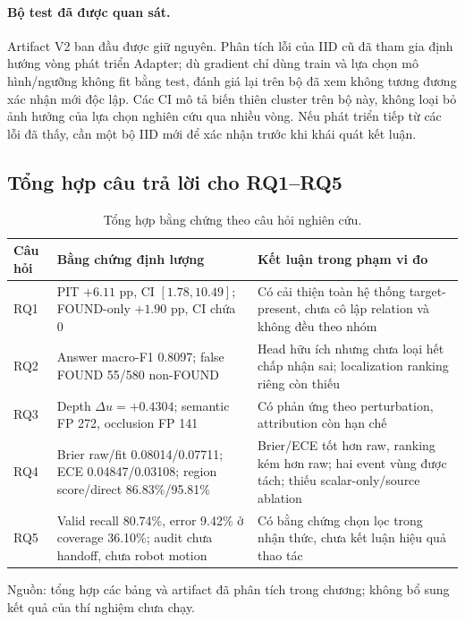 \paragraph{Bộ test đã được quan sát.}
Artifact V2 ban đầu được giữ nguyên. Phân tích lỗi của IID cũ đã
tham gia định hướng vòng phát triển Adapter; dù gradient chỉ dùng
train và lựa chọn mô hình/ngưỡng không fit bằng test, đánh giá lại
trên bộ đã xem không tương đương xác nhận mới độc lập. Các CI mô tả
biến thiên cluster trên bộ này, không loại bỏ ảnh hưởng của lựa chọn
nghiên cứu qua nhiều vòng. Nếu phát triển tiếp từ các lỗi đã thấy,
cần một bộ IID mới để xác nhận trước khi khái quát kết luận.

\subsection{Tổng hợp câu trả lời cho RQ1--RQ5}

\begin{table}[htbp]
    \centering
    \setlength{\tabcolsep}{4pt}
    \renewcommand{\arraystretch}{1.15}
    \caption{Tổng hợp bằng chứng theo câu hỏi nghiên cứu.}
    \label{tab:results-rq-summary}
    \small
    \begin{tabularx}{\textwidth}{@{}l>{\raggedright\arraybackslash}p{}>{\raggedright\arraybackslash}X@{}}
        \toprule
        Câu hỏi & Bằng chứng định lượng & Kết luận trong phạm vi đo \\
        \midrule
        RQ1 & PIT $+6.11$ pp, CI $[1.78,10.49]$;
        FOUND-only $+1.90$ pp, CI chứa 0 &
        Có cải thiện toàn hệ thống target-present,
        chưa cô lập relation và không đều theo nhóm \\
        RQ2 & Answer macro-F1 0.8097;
        false FOUND 55/580 non-FOUND &
        Head hữu ích nhưng chưa loại hết chấp nhận sai;
        localization ranking riêng còn thiếu \\
        RQ3 & Depth $\Delta u=+0.4304$;
        semantic FP 272, occlusion FP 141 &
        Có phản ứng theo perturbation,
        attribution còn hạn chế \\
        RQ4 & Brier raw/fit 0.08014/0.07711;
        ECE 0.04847/0.03108;
        region score/direct 86.83\%/95.81\% &
        Brier/ECE tốt hơn raw, ranking kém hơn raw; hai event vùng
        được tách; thiếu scalar-only/source ablation \\
        RQ5 & Valid recall 80.74\%, error 9.42\%
        ở coverage 36.10\%;
        audit chưa handoff, chưa robot motion &
        Có bằng chứng chọn lọc trong nhận thức,
        chưa kết luận hiệu quả thao tác \\
        \bottomrule
    \end{tabularx}
    \vspace{2pt}
    {\footnotesize\raggedright Nguồn: tổng hợp các bảng và
    artifact đã phân tích trong chương; không bổ
    sung kết quả của thí nghiệm chưa chạy.\par}
\end{table}

